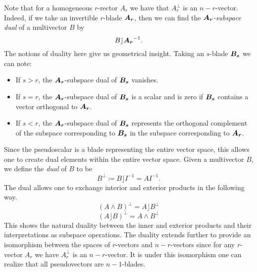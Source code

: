 Note that for a homogeneous $r$-rector $A_r$ we have that $A_r^\perp$ is an $n-r$-vector. Indeed, if we take an invertible $r$-blade $\boldsymbol{A_r}$, then we can find the \emph{$\boldsymbol{A_r}$-subspace dual} of a multivector $B$ by
\[
B \rfloor \boldsymbol{A_r}^{-1}.
\]
The notions of duality here give us geometrical insight. Taking an $s$-blade $\boldsymbol{B_s}$ we can note:
\begin{itemize}
    \item If $s>r$, the $\boldsymbol{A_r}$-subspace dual of $\boldsymbol{B_s}$ vanishes.
    \item If $s=r$, the $\boldsymbol{A_r}$-subspace dual of $\boldsymbol{B_s}$ is a scalar and is zero if $\boldsymbol{B_s}$ contains a vector orthogonal to $\boldsymbol{A_r}$.
    \item If $s<r$, the $\boldsymbol{A_r}$-subspace dual of $\boldsymbol{B_s}$ represents the orthogonal complement of the subspace corresponding to $\boldsymbol{B_s}$ in the subspace corresponding to $\boldsymbol{A_r}$.
\end{itemize}  
Since the pseudoscalar is a blade representing the entire vector space, this allows one to create dual elements within the entire vector space. Given a multivector $B$, we define the \emph{dual} of $B$ to be
\[
B^\perp \coloneqq B \rfloor I^{-1} = AI^{-1}.
\]
The dual allows one to exchange interior and exterior products in the following way.
\begin{equation}
\label{eq:wedge_to_dot}
 (A \wedge B)^\perp  = A\rfloor B^\perp
\end{equation}
\begin{equation}
\label{eq:dot_to_wedge}
    (A\rfloor B)^\perp = A \wedge B^\perp
\end{equation}
This shows the natural duality between the inner and exterior products and their interpretations as subspace operations. The duality extends further to provide an isomorphism between the spaces of $r$-vectors and $n-r$-vectors since for any $r$-vector $A_r$ we have $A_r^\perp$ is an $n-r$-vector. It is under this isomorphism one can realize that all pseudovectors are $n-1$-blades. 

